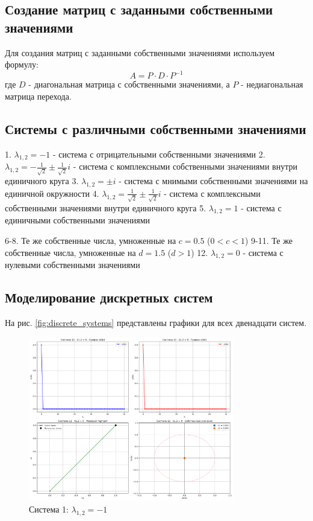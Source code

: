 \subsection{Создание матриц с заданными собственными значениями}

Для создания матриц с заданными собственными значениями используем формулу:
\begin{equation}
A = P \cdot D \cdot P^{-1}
\end{equation}
где $D$ - диагональная матрица с собственными значениями, а $P$ - недиагональная матрица перехода.

\subsection{Системы с различными собственными значениями}

1. $\lambda_{1,2} = -1$ - система с отрицательными собственными значениями
2. $\lambda_{1,2} = -\frac{1}{\sqrt{2}} \pm \frac{1}{\sqrt{2}}i$ - система с комплексными собственными значениями внутри единичного круга
3. $\lambda_{1,2} = \pm i$ - система с мнимыми собственными значениями на единичной окружности
4. $\lambda_{1,2} = \frac{1}{\sqrt{2}} \pm \frac{1}{\sqrt{2}}i$ - система с комплексными собственными значениями внутри единичного круга
5. $\lambda_{1,2} = 1$ - система с единичными собственными значениями

6-8. Те же собственные числа, умноженные на $c = 0.5$ ($0 < c < 1$)
9-11. Те же собственные числа, умноженные на $d = 1.5$ ($d > 1$)
12. $\lambda_{1,2} = 0$ - система с нулевыми собственными значениями

\subsection{Моделирование дискретных систем}

На рис. \ref{fig:discrete_systems} представлены графики для всех двенадцати систем.

\begin{figure}[h!]
\centering
\includegraphics[width=0.8\textwidth]{images/task2/system_1_lambda_minus_1.png}
\caption{Система 1: $\lambda_{1,2} = -1$}
\label{fig:discrete1}
\end{figure}

